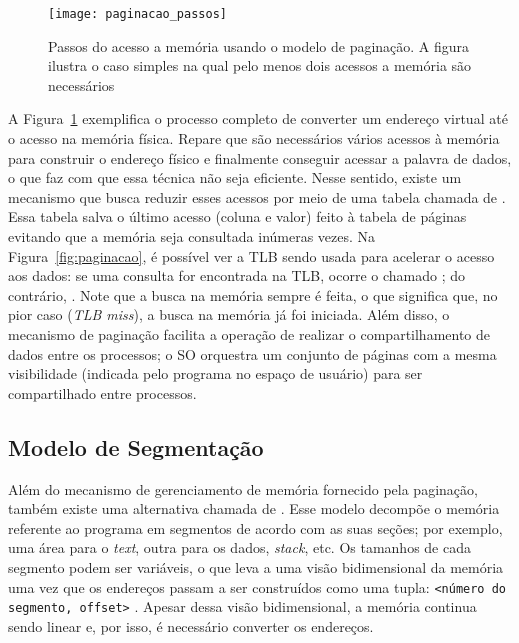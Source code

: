 \begin{figure}[!h]
  \centering
  \texttt{[image: paginacao\_passos]} 
  \caption{Passos do acesso a memória usando o modelo de paginação. A figura ilustra o caso simples na qual pelo menos dois acessos a memória são necessários}
  \label{fig:passos_paginacao}
\end{figure}


A Figura~\ref{fig:passos_paginacao} exemplifica o processo completo de
converter um endereço virtual até o acesso na memória física. Repare que são
necessários vários acessos à memória para construir o endereço físico e
finalmente conseguir acessar a palavra de dados, o que faz com que essa técnica
não seja eficiente.  Nesse sentido, existe um mecanismo que busca reduzir esses
acessos por meio de uma tabela chamada de . Essa tabela salva o último acesso (coluna e valor) feito à
tabela de páginas evitando que a memória seja consultada inúmeras vezes. Na
Figura~\ref{fig:paginacao}, é possível ver a TLB sendo usada para acelerar o
acesso aos dados: se uma consulta for encontrada na TLB, ocorre o chamado
; do contrário, . Note que a busca na memória sempre é feita, o que significa
que, no pior caso (\emph{TLB miss}), a busca na memória já foi iniciada. Além
disso, o mecanismo de paginação facilita a operação de realizar o
compartilhamento de dados entre os processos; o SO orquestra um conjunto de
páginas com a mesma visibilidade (indicada pelo programa no espaço de usuário)
para ser compartilhado entre processos.

\subsection{Modelo de Segmentação}

Além do mecanismo de gerenciamento de memória fornecido pela paginação, também
existe uma alternativa chamada de . Esse modelo
decompõe o memória referente ao programa em segmentos de acordo com as suas
seções; por exemplo, uma área para o \textit{text}, outra para os dados,
\textit{stack}, etc. Os tamanhos de cada segmento podem ser variáveis, o que
leva a uma visão bidimensional da memória uma vez que os endereços passam a ser
construídos como uma tupla: \texttt{<número do segmento, offset>}
\citep{silberschatz}. Apesar dessa visão bidimensional, a memória continua
sendo linear e, por isso, é necessário converter os endereços.

